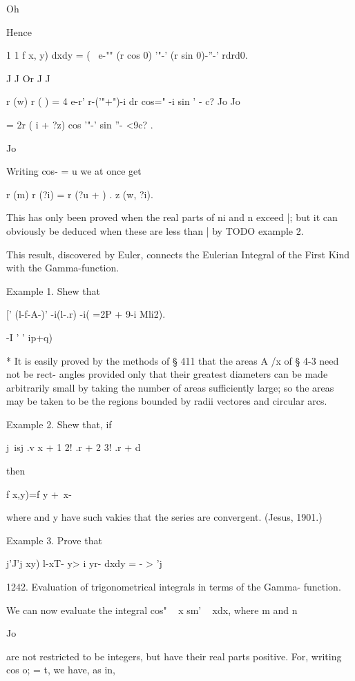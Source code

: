 Oh

Hence

1 1 f x, y) dxdy = ( \ e-"" (r cos 0) '"-' (r sin 0)-''-' rdrd0.

J J Or J J

r (w) r ( ) = 4 e-r' r-('"+")-i dr cos=" -i sin ' - c? Jo Jo

= 2r ( i + ?z) cos '"-' sin ''- <9c? .

Jo

Writing cos- = u we at once get

r (m) r (?i) = r (?u + ) . z (w, ?i).

This has only been proved when the real parts of ni and n exceed |;
but it can obviously be deduced when these are less than | by TODO
example 2.

This result, discovered by Euler, connects the Eulerian Integral of
the First Kind with the Gamma-function.

Example 1. Shew that

[' (l-f-A-)' -i(l-.r) -i( =2P + 9-i Mli2).

  -I ' ' ip+q)

* It is easily proved by the methods of § 411 that the areas A /x of §
4-3 need not be rect- angles provided only that their greatest
diameters can be made arbitrarily small by taking the number of areas
sufficiently large; so the areas may be taken to be the regions
bounded by radii vectores and circular arcs.

%
%

Example 2. Shew that, if

j\ isj .v x + 1 2! .r + 2 3! .r + d

then

f x,y)=f y + \,x-\ \

where and y have such vakies that the series are convergent. (Jesus,
1901.)

Example 3. Prove that

j'J'j xy) l-xT- y> i yr- dxdy = - > 'j


1242. Evaluation of trigonometrical integrals in terms of the Gamma-
function.

We can now evaluate the integral cos" ~ x sm' ~ xdx, where m and n

Jo

are not restricted to be integers, but have their real parts positive.
For, writing cos o; = t, we have, as in,

